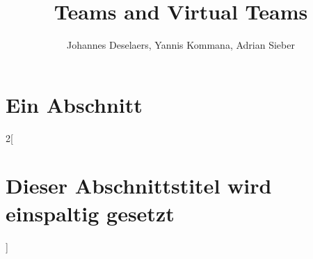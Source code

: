 \documentclass[a4paper]{article}
\begin{document}
\title{Teams and Virtual Teams}
\author{Johannes Deselaers, Yannis Kommana, Adrian Sieber}

\maketitle

\section{Ein Abschnitt}

\blindtext

\begin{multicols}{2}[\section{Dieser Abschnittstitel wird einspaltig gesetzt}]

\blindtext

\end{multicols}



 
\end{document}
